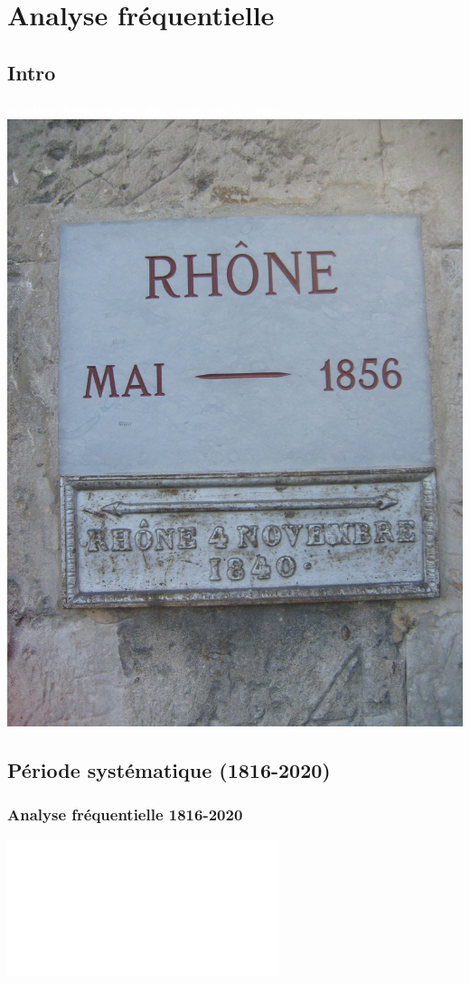 \documentclass[compress,9pt]{beamer}
\begin{document}
\section{Analyse fréquentielle}
	\subsection{Intro}
	{
    \begin{frame}
        \begin{center}
		 	\textcolor{white}{\large \textbf{Analyse fréquentielle des crues sur 5 siècles}}\\
		 	\vspace{0.8cm}
		 	\includegraphics[width = .4\textwidth]{./Figures/RepAvi.jpg} 
        \end{center}
    \end{frame}
    }

	\subsection{Période systématique (1816-2020)}
	\begin{frame}
		\frametitle{Analyse fréquentielle 1816-2020}
		\centering
		\includegraphics<1>[width = .7\textwidth]{./Figures/EchMixteC4Bcr.pdf} 
	\end{frame}
	
\end{document}

